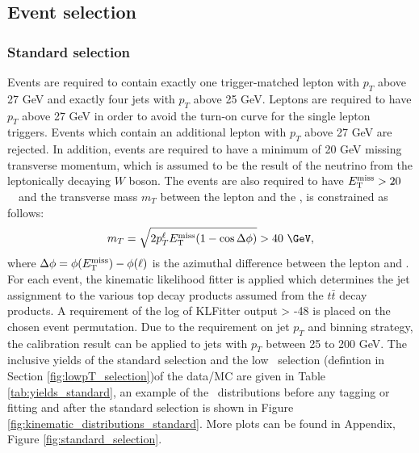 \documentclass[letterpaper,12pt]{article}
\begin{document}
\subsection{Event selection}
\label{Event selection}


\subsubsection{Standard selection}
\label{standard selection}
Events are required to contain exactly one trigger-matched 
lepton with $p_{T}$ above 27 GeV and exactly four jets with 
$p_{T}$ above 25 GeV. Leptons are required to have $p_{T}$ 
above 27 GeV in order to avoid the turn-on curve for the 
single lepton triggers. Events which contain an additional 
lepton with $p_T$ above 27 GeV are rejected. 
In addition, events are required 
to have a minimum of 20 GeV missing transverse momentum, which is 
assumed to be the result of the neutrino from the leptonically 
decaying $W$ boson. 
The events are also required to have $E_{\mathrm T}^{\mathrm{miss}} > 20$~\GeV\ and the transverse
mass $m_T$ between the lepton and the \MET, is
constrained as follows:
\[ m_T = \sqrt{2 p_T^\ell \MET (1-\cos\Delta\phi)} > 40~\GeV,\]
where $\Delta\phi = \phi(E_{\mathrm T}^{\mathrm{miss}})-\phi(\ell)$ is the azimuthal difference between
the lepton and \MET.
For each event, the kinematic likelihood fitter 
is applied which determines the jet assignment to the various top 
decay products assumed from the $t\bar{t}$ decay products. 
A requirement of the log of KLFitter output > -48 is placed 
on the chosen event permutation. 
Due to the requirement on jet $p_T$ and binning strategy, the calibration 
result can be applied to jets with $p_{T}$ between 25 to 200 GeV. 
The inclusive yields of the standard selection and the low \pt\ selection 
(defintion in Section \ref{fig:lowpT_selection})of the data/MC are 
given in Table \ref{tab:yields_standard}, an example of 
the \pt\ distributions before any tagging or fitting and 
after the standard selection is shown in Figure \ref{fig:kinematic_distributions_standard}. 
More plots can be found in Appendix, Figure \ref{fig:standard_selection}.
\end{document}
